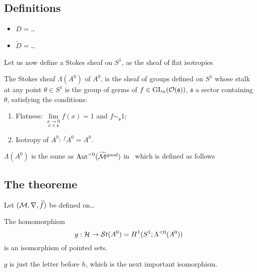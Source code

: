 \subsection{Definitions}
\begin{itemize}
  \item $D=$\dots
  \item $\tilde D=$\dots
\end{itemize}

Let us now define a Stokes sheaf on $S^1$, as the sheaf of flat
isotropies\TODO[\dots]
\begin{defn}
  The Stokes sheaf $\Lambda(A^0)$ of $A^0$, is the sheaf of groups defined on
  $S^1$ whose stalk at any point $\theta\in S^1$ is the group of germs of
  $f\in\operatorname{GL}_n(\mathcal{O}(\mathfrak{s}))$, $\mathfrak{s}$ a sector containing $\theta$, satisfying
  the conditions:
  \begin{enumerate}
    \item Flatness: $\underset{x\in\mathfrak{s}}{\underset{x\to0}{\lim}}f(x)=1$
      and $f\sim_{\mathfrak{s}} 1$;
    \item Isotropy of $A^0$: ${}^f\!A^0=A^0$.
  \end{enumerate}
  \begin{rem}
    $\Lambda(A^0)$ is the same as $\operatorname{Aut}^{<0}(\widetilde{\mathcal{M}}^{good})$
    in~\cite{sabbah2007isomonodromic} which is defined as follows \TODO
  \end{rem}
\end{defn}

\subsection{The theoreme}
Let $(\mathcal{M},\nabla,\widehat f)$ be defined on\dots

\begin{tthm}
  \label{thm:mainThm1}
  The homomorphism
  \[
    g:\mathcal{H}\to\mathcal{S}{}t(A^0)=H^1(S^1;\Lambda^{<0}(A^0))
  \]
  is an isomorphism of pointed  sets.
  \begin{rem}
    $g$ is just the letter before $h$, which is the next important isomorphism.
  \end{rem}
\end{tthm}
\begin{comment}
  \begin{rem}
    \marginnote{\cite{Loday1994} Remark I.2.2}
    To another normal form $A^1={}^\Phi\!A^0$ there correspond cochains which
    are conjugated via $\Phi$.
    We get the following commutative diagram:
    \[ \begin{tikzcd}
        G\backslash\hat G(A^1) \rar{\cdot\Phi}\dar{\exp} 
        & G\backslash\hat G(A^0) \dar{\exp}
        & \hat F \arrow[|->]{r}\arrow[|->]{d}
        & \hat F\Phi \arrow[|->]{d}
      \\ H^1(S^1;\lambda(A^1)) \rar
        & H^1(S^1;\lambda(A^0))
        & \exp_{\mu_1}(\hat F) \arrow[|->]{r}
        & \exp_{\mu_0}(\hat F\Phi)
    \end{tikzcd} \]
    where $\exp_{\mu_0}(\hat F\Phi)=\Phi^{-1}\exp_{\mu_0}(\hat F)\Phi$.
  \end{rem}
\end{comment}

